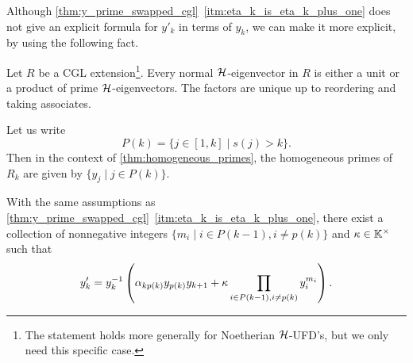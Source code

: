 Although \cref{thm:y_prime_swapped_cgl}~\ref*{itm:eta_k_is_eta_k_plus_one} does not
give an explicit formula for $y'_k$ in terms of $y_k$, we can make it more explicit, by
using the following fact.
\begin{theorem}\label{thm:normal_in_UFD}
	Let $R$ be a CGL extension\footnote{The statement holds more generally for Noetherian
		$\mathcal{H}$-UFD's, but we only need this specific case.}. Every normal $\mathcal{H}$-eigenvector in
	$R$ is either a unit or a product of prime $\mathcal{H}$-eigenvectors. The factors are unique
	up to reordering and taking associates.
\end{theorem}
Let us write
\begin{equation}\label{eq:P_of_k}
	P(k) = \{j \in [1,  k] \mid s(j) > k\}.
\end{equation}
%
Then in the context of \cref{thm:homogeneous_primes}, the homogeneous primes of $R_k$
are given by $\{y_j \mid j \in P(k)\}$.
\begin{theorem}\label{thm:almost_cluster_mutation}
	With the same assumptions as
	\cref{thm:y_prime_swapped_cgl}~\ref*{itm:eta_k_is_eta_k_plus_one}, there exist a
	collection of nonnegative integers $\{m_i \mid i \in P(k-1), i\neq p(k)\}$ and $\kappa
		\in \mathbb{K}^\times$ such that
	\begin{equation*}
		y'_k = y_k^{-1} \left(\alpha_{kp(k)}y_{p(k)}y_{k+1} + \kappa \prod_{i \in P(k-1), i\neq p(k)} y_i^{m_i}\right).
	\end{equation*}
\end{theorem}
